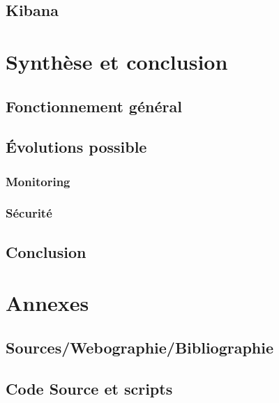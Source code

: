 \documentclass[a4paper,12pt,one side,titlepage]{report}
\begin{document}
\chapter{Kibana}


\part{Synthèse et conclusion}
\chapter{Fonctionnement général}

\chapter{Évolutions possible}
\section{Monitoring}
\section{Sécurité}

\chapter{Conclusion}

\part{Annexes}
\chapter{Sources/Webographie/Bibliographie}

\chapter{Code Source et scripts}




\printglossaries
\end{document}
